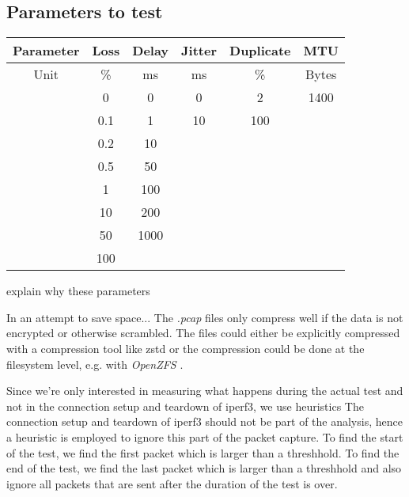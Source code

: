 \subsection{Parameters to test}
\begin{table}[h!]
	\centering
	\begin{tabular}{|c|c|c|c|c|c|}
		\hline
		Parameter & Loss & Delay & Jitter & Duplicate & MTU\\ \hline
		Unit      &  \%  &  ms   &   ms   &   \%      & Bytes \\ \hline
		          &  0   &     0 &      0 &    2      & 1400 \\ \hline
		          &  0.1 &     1 &     10 &  100      & \\ \hline
		          &  0.2 &    10 &        &           & \\ \hline
		          &  0.5 &    50 &        &           & \\ \hline
		          &    1 &   100 &        &           & \\ \hline
		          &   10 &   200 &        &           & \\ \hline
		          &   50 &  1000 &        &           & \\ \hline
		          &  100 &       &        &           & \\ \hline

	\end{tabular}
\end{table}
explain why these parameters







In an attempt to save space...
The \textit{.pcap} \cite{wiki:Pcap} files only compress well if the data is not encrypted or otherwise scrambled.
The files could either be explicitly compressed with a compression tool like zstd or the compression could be done at the filesystem level, e.g. with \textit{OpenZFS} \cite{OpenZFS}. 


Since we're only interested in measuring what happens during the actual test and not in the connection setup and teardown of iperf3, we use heuristics
The connection setup and teardown of iperf3 should not be part of the analysis, hence a heuristic is employed to ignore this part of the packet capture.
To find the start of the test, we find the first packet which is larger than a threshhold. To find the end of the test, we find the last packet which is larger than a threshhold and also ignore all packets that are sent after the duration of the test is over.


